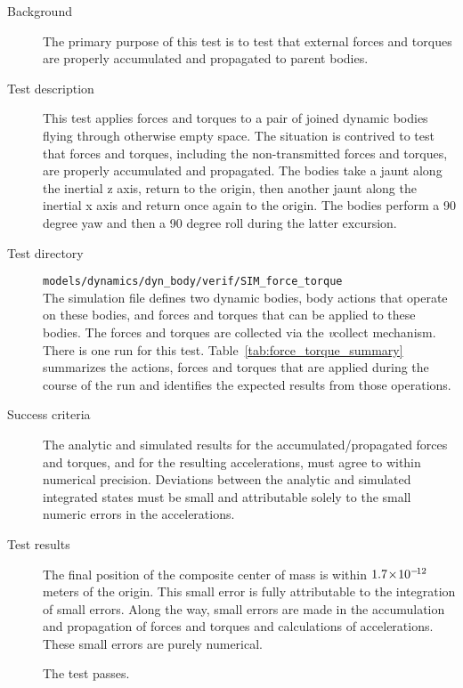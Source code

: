 \label{test:force_torque}
\begin{description}
\item[Background] The primary purpose of this test is to test that
external forces and torques are properly accumulated and propagated
to parent bodies.

\item[Test description]
This test applies forces and torques to a pair of joined dynamic bodies
flying through otherwise empty space.
The situation is contrived to test that forces and torques, including
the non-transmitted forces and torques, are properly accumulated
and propagated. The bodies take a jaunt along the inertial z axis,
return to the origin, then another jaunt along the inertial x axis
and return once again to the origin. The bodies perform a 90 degree yaw and then
a 90 degree roll during the latter excursion.

\item[Test directory]
{\tt models/dynamics/dyn\_body/verif/SIM\_force\_torque} \\
The simulation \Sdefine file defines two dynamic bodies,
body actions that operate on these bodies,
and forces and torques that can be applied to these bodies.
The forces and torques are collected via the {\emph vcollect} mechanism.
There is one run for this test.
Table~\ref{tab:force_torque_summary} summarizes the actions, forces and
torques that are applied during the course of the run and
identifies the expected results from those operations.

\item[Success criteria] The analytic and simulated results
for the accumulated/propagated forces and torques,
and for the resulting accelerations,
must agree to within numerical precision. Deviations between
the analytic and simulated integrated states must be small and
attributable solely to the small numeric errors in the accelerations.

\item[Test results] The final position of the composite center of mass
is within $1.7\!\times\! 10^{-\!12}$ meters of the origin. This small error
is fully attributable to the integration of small errors. Along the way,
small errors are made in the accumulation and propagation of forces and
torques and calculations of accelerations. These small errors are purely
numerical.

The test passes.


\end{description}
